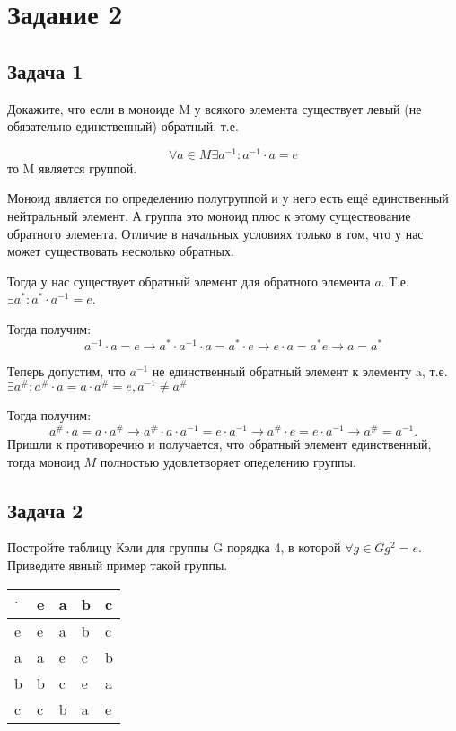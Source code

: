 \documentclass[a4paper,14pt]{article} %
\begin{document}

\section{Задание 2}
\subsection{Задача 1}
Докажите, что если в моноиде M у всякого элемента существует левый (не обязательно единственный) обратный, т.е.

\begin{equation*}
	\forall a \in M \exists a^{-1} : a^{-1} \cdot a = e 
\end{equation*}
то M является группой.

Моноид является по определению полугруппой и у него есть ещё единственный нейтральный элемент.
А группа это моноид плюс к этому существование обратного элемента. Отличие в начальных условиях только в том, что у нас может существовать несколько обратных.

Тогда у нас существует обратный элемент для обратного элемента $a$. Т.е. $\exists a^{*} : a^{*} \cdot a^{-1} = e$.

Тогда получим: 
\begin{equation*}
	a^{-1} \cdot a = e \rightarrow a^{*} \cdot a^{-1} \cdot a = a^{*} \cdot e \rightarrow e \cdot a = a^{*} e \rightarrow a = a^{*}
\end{equation*}

Теперь допустим, что $a^{-1}$ не единственный обратный элемент к элементу a, т.е. $\exists a^{\#} : a^{\#} \cdot a = a \cdot a^{\#} = e, a^{-1} \not= a^{\#}$

Тогда получим:
\begin{equation*}
	a^{\#} \cdot a = a \cdot a^{\#} \rightarrow a^{\#} \cdot a \cdot a^{-1} = e \cdot a^{-1} \rightarrow a^{\#} \cdot e = e \cdot a^{-1} \rightarrow a^{\#} = a^{-1}.
\end{equation*}
Пришли к противоречию и получается, что обратный элемент единственный, тогда моноид $M$ полностью удовлетворяет опеделению группы.


\subsection{Задача 2}
Постройте таблицу Кэли для группы G порядка 4, в которой $\forall g \in G g^2 = e$. Приведите явный пример такой группы.

\begin{table}[H]
	\begin{tabular}{|l|l|l|l|l|}
	\hline
	$\cdot$ & e & a & b & c \\ \hline
	e   & e & a & b & c \\ \hline
	a   & a & e & c & b \\ \hline
	b   & b & c & e & a \\ \hline
	c   & c & b & a & e \\ \hline
	\end{tabular}
	\end{table}
\end{document}
